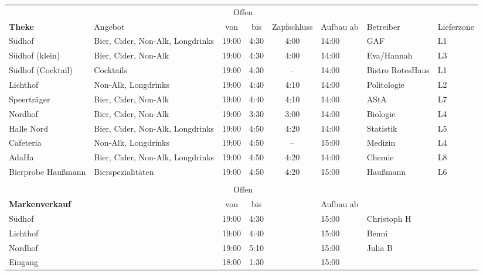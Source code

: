 \begin{center}
  \begin{tabular}{p{2cm}p{4cm}cccp{1.1cm}p{2.2cm}p{1cm}}
    & & \multicolumn{2}{c}{Offen} \\
    \multirow{-2}{*}{\textbf{Theke}} & \multirow{-2}{*}{Angebot} & von & bis & \multirow{-2}{*}{\parbox{1cm}{Zapf\-schluss}} & \multirow{-2}{*}{\parbox{1cm}{Aufbau ab}} & \multirow{-2}{*}{Betreiber} & \multirow{-2}{*}{\parbox{1cm}{Liefer\-zone}} \\ \hline \hline
    Südhof & Bier, Cider, Non-Alk, Longdrinks & 19:00 & 4:30 & 4:00 & 14:00 & GAF & L1 \\ \hline
    Südhof (klein) & Bier, Cider, Non-Alk & 19:00 & 4:30 & 4:00 & 14:00 & Eva/Hannah & L3 \\ \hline
    Südhof (Cocktail) & Cocktails & 19:00 & 4:30 & -- & 14:00 & Bistro RotesHaus & L1 \\ \hline
    Lichthof & Non-Alk, Longdrinks & 19:00 & 4:40 & 4:10 & 14:00 & Politologie & L2 \\ \hline
    Speerträger & Bier, Cider, Non-Alk & 19:00 & 4:40 & 4:10 & 14:00 & AStA & L7 \\ \hline
    Nordhof & Bier, Cider, Non-Alk & 19:00 & 3:30 & 3:00 & 14:00 & Biologie & L4 \\ \hline
    Halle Nord & Bier, Cider, Non-Alk, Longdrinks & 19:00 & 4:50 & 4:20 & 14:00 & Statistik & L5 \\ \hline
    Cafeteria & Non-Alk, Longdrinks & 19:00 & 4:50 & -- & 15:00 & Medizin & L4 \\ \hline %
    AdaHa & Bier, Cider, Non-Alk, Longdrinks & 19:00 & 4:50 & 4:20 & 14:00 & Chemie & L8 \\ \hline
    Bierprobe Haußmann & Bierspezialitäten & 19:00 & 4:50 & 4:20 & 15:00 & Haußmann & L6 \\ \\
                        & & \multicolumn{2}{c}{Offen} \\
    \multirow{-2}{*}{\textbf{Markenverkauf}} & & von & bis & & \multirow{-2}{*}{\parbox{1cm}{Aufbau ab}} \\ \hline \hline
      Südhof & & 19:00 & 4:30 & & 15:00 & Christoph H \\
      Lichthof & & 19:00 & 4:40 & & 15:00 & Benni \\
      Nordhof & & 19:00 & 5:10 & & 15:00 & Julia B \\
      Eingang & & 18:00 & 1:30 & & 15:00
  \end{tabular}
\end{center}

